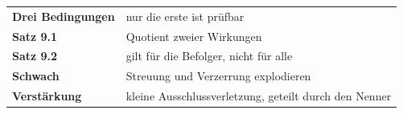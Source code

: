 \begin{merksatz}
\begin{center}
\renewcommand{\arraystretch}{1.5}
\begin{tabular}{@{}P{3.0cm}P{5.6cm}@{}}
\toprule
\textbf{Drei Bedingungen} & nur die erste ist prüfbar\\
\textbf{Satz 9.1} & Quotient zweier Wirkungen\\
\textbf{Satz 9.2} & gilt für die Befolger, nicht für alle\\
\textbf{Schwach} & Streuung und Verzerrung explodieren\\
\textbf{Verstärkung} & kleine Ausschlussverletzung, geteilt durch den Nenner\\
\bottomrule
\end{tabular}
\end{center}

\begin{center}
\begin{minipage}{0.88\textwidth}
\end{minipage}
\end{center}
\end{merksatz}
